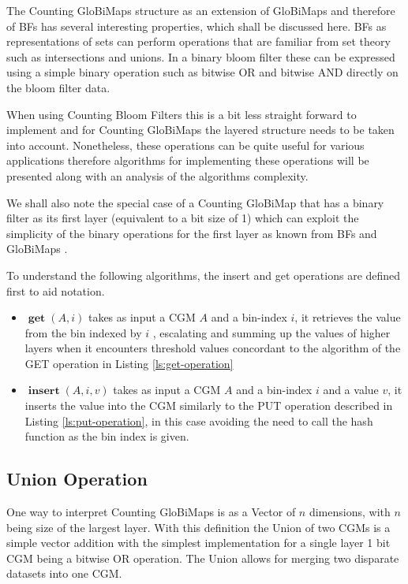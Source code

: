 \documentclass[sigconf, nonacm]{acmart}
\DeclareMathOperator{\get}{\textbf{get}}
\DeclareMathOperator{\insertv}{\textbf{insert}}
\begin{document}
The Counting GloBiMaps structure as an extension of GloBiMaps and
therefore of BFs has several interesting properties, which
shall be discussed here. BFs as representations of sets can
perform operations that are familiar from set theory such as
intersections and unions. In a binary bloom filter these can be
expressed using a simple binary operation such as bitwise OR and bitwise
AND directly on the bloom filter data.

When using Counting Bloom Filters this is a bit less straight forward to
implement and for Counting GloBiMaps the layered structure needs to be
taken into account. Nonetheless, these operations can be quite useful for
various applications therefore algorithms for implementing these
operations will be presented along with an analysis of the algorithms
complexity.

We shall also note the special case of a Counting GloBiMap that has a binary filter as its first layer (equivalent to a bit size of 1) which can exploit the simplicity of the binary operations for the first layer as known from BFs and GloBiMaps \cite{werner2019globimaps}.

To understand the following algorithms, the insert and get operations are defined first to aid notation.

\begin{itemize}
  \item{
        $\get(A, i)$ takes as input a CGM $A$ and a bin-index $i$, it retrieves the value from the bin indexed by $i$ , escalating and summing up the values of higher layers when it encounters threshold values concordant to the algorithm of the GET operation in Listing \ref{ls:get-operation} }
  \item{
        $\insertv(A, i, v)$ takes as input a CGM $A$ and a bin-index $i$ and a value $v$, it inserts the value into the CGM similarly to the PUT operation described in Listing \ref{ls:put-operation}, in this case avoiding the need to call the hash function as the bin index is given.}
\end{itemize}

\subsection{Union Operation}\label{union-operation}

One way to interpret Counting GloBiMaps is as a Vector of $n$
dimensions, with $n$ being size of the largest layer. With this
definition the Union of two CGMs is a simple vector addition with the
simplest implementation for a single layer 1 bit CGM being a bitwise OR
operation. The Union allows for merging two disparate datasets into one CGM.
\end{document}
